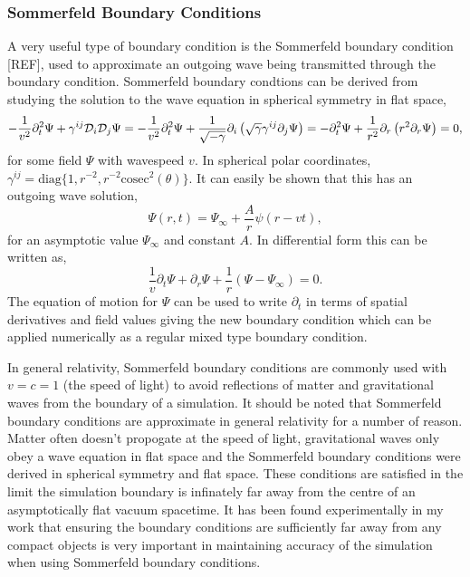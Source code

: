 \subsubsection{Sommerfeld Boundary Conditions} \label{grchombo:sec:sommerfeld}
A very useful type of boundary condition is the Sommerfeld boundary condition [REF], used to approximate an outgoing wave being transmitted through the boundary condition. Sommerfeld boundary condtions can be derived from studying the solution to the wave equation in spherical symmetry in flat space,
\begin{equation}
-\frac{1}{v^2}\partial_t^2 \Psi +  \gamma^{ij}\mathcal{D}_i \mathcal{D}_j \Psi = 
-\frac{1}{v^2}\partial_t^2 \Psi +\frac{1}{\sqrt{-\gamma}} \partial_i \left(\sqrt{\gamma} \gamma^{ij} \partial_j \Psi \right) =
-\partial^2_t \Psi + \frac{1}{r^2}\partial_r \left( r^2 \partial_r \Psi\right)=0,
\end{equation}
for some field $\Psi$ with wavespeed $v$. In spherical polar coordinates, $\gamma^{ij}=\mathrm{diag}\{1,r^{-2},r^{-2} \mathrm{cosec}^2(\theta) \}$. It can easily be shown that this has an outgoing wave solution,
\begin{equation}
\Psi(r,t) = \Psi_\infty + \frac{A}{r}\psi(r-vt),
\end{equation}
for an asymptotic value $\Psi_\infty$ and constant $A$. In differential form this can be written as,
\begin{equation}
\frac{1}{v}\partial_t \Psi + \partial_r \Psi+ \frac{1}{r}(\Psi-\Psi_\infty) =0.
\end{equation}
The equation of motion for $\Psi$ can be used to write $\partial_t$ in terms of spatial derivatives and field values giving the new boundary condition which can be applied numerically as a regular mixed type boundary condition. 

In general relativity, Sommerfeld boundary conditions are commonly used with $v=c=1$ (the speed of light) to avoid reflections of matter and gravitational waves from the boundary of a simulation. It should be noted that Sommerfeld boundary conditions are approximate in general relativity for a number of reason. Matter often doesn't propogate at the speed of light, gravitational waves only obey a wave equation in flat space and the Sommerfeld boundary conditions were derived in spherical symmetry and flat space. These conditions are satisfied in the limit the simulation boundary is infinately far away from the centre of an asymptotically flat vacuum spacetime. It has been found experimentally in my work that ensuring the boundary conditions are sufficiently far away from any compact objects is very important in maintaining accuracy of the simulation when using Sommerfeld boundary conditions.


